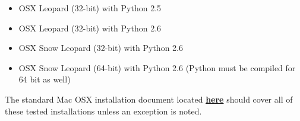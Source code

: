 \documentclass[12pt]{article}
\begin{document}
\begin{itemize}

\item OSX Leopard (32-bit) with Python 2.5
\item OSX Leopard (32-bit) with Python 2.6
\item OSX Snow Leopard (32-bit) with Python 2.6
\item OSX Snow Leopard (64-bit) with Python 2.6 (Python must be compiled for 64 bit as well)

\end{itemize}

The standard Mac OSX installation document located \href{../installation-osx/installation-osx.tex}{\bf here}
 should cover all of these tested installations unless an exception is noted.
\end{document}

